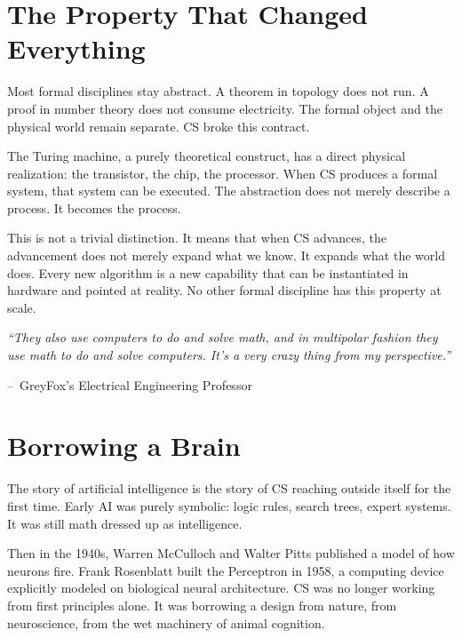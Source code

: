 \documentclass[11pt,a4paper]{article}
\renewenvironment{quote}
  {\list{}{\leftmargin=2.2em\rightmargin=2.2em\topsep=0.4em\parsep=0.3em}%
   \item\relax\itshape}
  {\endlist}
\newcommand{\attrib}[1]{\par\vspace{0.2em}\normalfont\small\hspace*{0em}--\ #1\par}
\begin{document}
\section{The Property That Changed Everything}

Most formal disciplines stay abstract. A theorem in topology does not run. A proof in number theory does not consume electricity. The formal object and the physical world remain separate. CS broke this contract.

The Turing machine, a purely theoretical construct, has a direct physical realization: the transistor, the chip, the processor. When CS produces a formal system, that system can be executed. The abstraction does not merely describe a process. It becomes the process.

This is not a trivial distinction. It means that when CS advances, the advancement does not merely expand what we know. It expands what the world does. Every new algorithm is a new capability that can be instantiated in hardware and pointed at reality. No other formal discipline has this property at scale.

\begin{quote}
``They also use computers to do and solve math, and in multipolar fashion they use math to do and solve computers. It's a very crazy thing from my perspective.''
\attrib{GreyFox's Electrical Engineering Professor}
\end{quote}

\section{Borrowing a Brain}

The story of artificial intelligence is the story of CS reaching outside itself for the first time. Early AI was purely symbolic: logic rules, search trees, expert systems. It was still math dressed up as intelligence.

Then in the 1940s, Warren McCulloch and Walter Pitts published a model of how neurons fire. Frank Rosenblatt built the Perceptron in 1958, a computing device explicitly modeled on biological neural architecture. CS was no longer working from first principles alone. It was borrowing a design from nature, from neuroscience, from the wet machinery of animal cognition.~\cite{mcculloch1943,rosenblatt1958}
\end{document}
